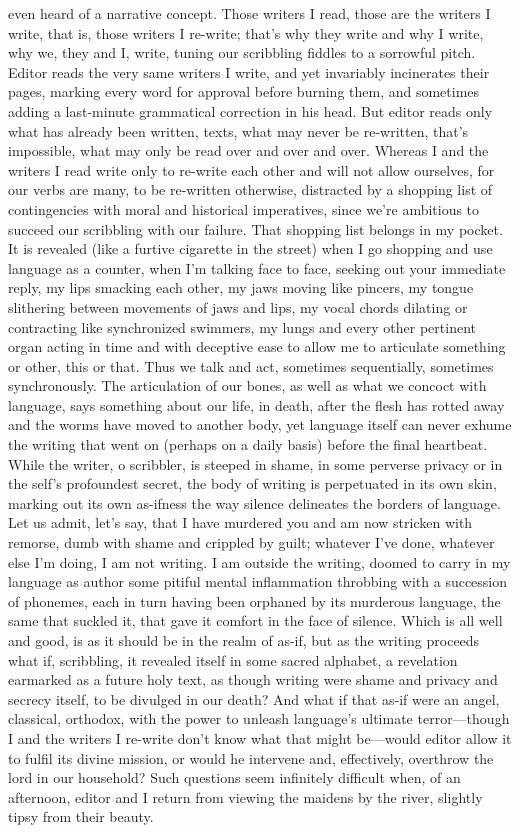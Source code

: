 \documentclass[
]{memoir}
\begin{document}
even heard of a narrative concept. Those writers I read, those are the
writers I write, that is, those writers I re-write; that's why they
write and why I write, why we, they and I, write, tuning our scribbling
fiddles to a sorrowful pitch. Editor reads the very same writers I
write, and yet invariably incinerates their pages, marking every word
for approval before burning them, and sometimes adding a last-minute
grammatical correction in his head. But editor reads only what has
already been written, texts, what may never be re-written, that's
impossible, what may only be read over and over and over. Whereas I and
the writers I read write only to re-write each other and will not allow
ourselves, for our verbs are many, to be re-written otherwise,
distracted by a shopping list of contingencies with moral and historical
imperatives, since we're ambitious to succeed our scribbling with our
failure. That shopping list belongs in my pocket. It is revealed (like a
furtive cigarette in the street) when I go shopping and use language as
a counter, when I'm talking face to face, seeking out your immediate
reply, my lips smacking each other, my jaws moving like pincers, my
tongue slithering between movements of jaws and lips, my vocal chords
dilating or contracting like synchronized swimmers, my lungs and every
other pertinent organ acting in time and with deceptive ease to allow me
to articulate something or other, this or that. Thus we talk and act,
sometimes sequentially, sometimes synchronously. The articulation of our
bones, as well as what we concoct with language, says something about
our life, in death, after the flesh has rotted away and the worms have
moved to another body, yet language itself can never exhume the writing
that went on (perhaps on a daily basis) before the final heartbeat.
While the writer, o scribbler, is steeped in shame, in some perverse
privacy or in the self's profoundest secret, the body of writing is
perpetuated in its own skin, marking out its own as-ifness the way
silence delineates the borders of language. Let us admit, let's say,
that I have murdered you and am now stricken with remorse, dumb with
shame and crippled by guilt; whatever I've done, whatever else I'm
doing, I am not writing. I am outside the writing, doomed to carry in my
language as author some pitiful mental inflammation throbbing with a
succession of phonemes, each in turn having been orphaned by its
murderous language, the same that suckled it, that gave it comfort in
the face of silence. Which is all well and good, is as it should be in
the realm of as-if, but as the writing proceeds what if, scribbling, it
revealed itself in some sacred alphabet, a revelation earmarked as a
future holy text, as though writing were shame and privacy and secrecy
itself, to be divulged in our death? And what if that as-if were an
angel, classical, orthodox, with the power to unleash language's
ultimate terror---though I and the writers I re-write don't know what
that might be---would editor allow it to fulfil its divine mission, or
would he intervene and, effectively, overthrow the lord in our
household? Such questions seem infinitely difficult when, of an
afternoon, editor and I return from viewing the maidens by the river,
slightly tipsy from their beauty.
\end{document}
